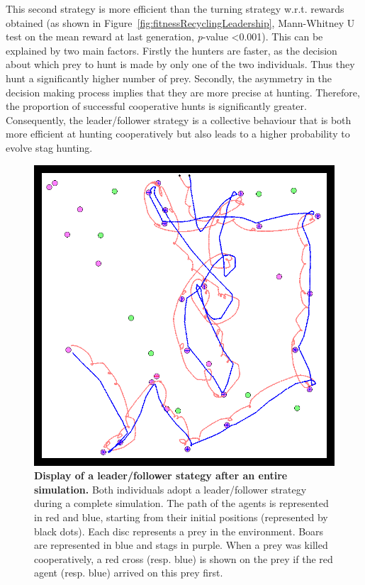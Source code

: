     This second strategy is more efficient than the turning strategy w.r.t. rewards obtained (as shown in Figure~\ref{fig:fitnessRecyclingLeadership}, Mann-Whitney U test on the mean reward at last generation, {\em p}-value \textless 0.001). This can be explained by two main factors. Firstly the hunters are faster, as the decision about which prey to hunt is made by only one of the two individuals. Thus they hunt a significantly higher number of prey. Secondly, the asymmetry in the decision making process implies that they are more precise at hunting. Therefore, the proportion of successful cooperative hunts is significantly greater. Consequently, the leader/follower strategy is a collective behaviour that is both more efficient at hunting cooperatively but also leads to a higher probability to evolve stag hunting.

    \begin{figure}[h]
      \centering
        \includegraphics[width=0.7\linewidth]{fig/ArticleBio2/Fig5.png}
        \caption{\textbf{Display of a leader/follower stategy after an entire simulation.}
        Both individuals adopt a leader/follower strategy during a complete simulation. The path of the agents is represented in red and blue, starting from their initial positions (represented by black dots). Each disc represents a prey in the environment. Boars are represented in blue and stags in purple. When a prey was killed cooperatively, a red cross (resp. blue) is shown on the prey if the red agent (resp. blue) arrived on this prey first.}
      \label{fig:figLeadershipBehaviour}
    \end{figure}


